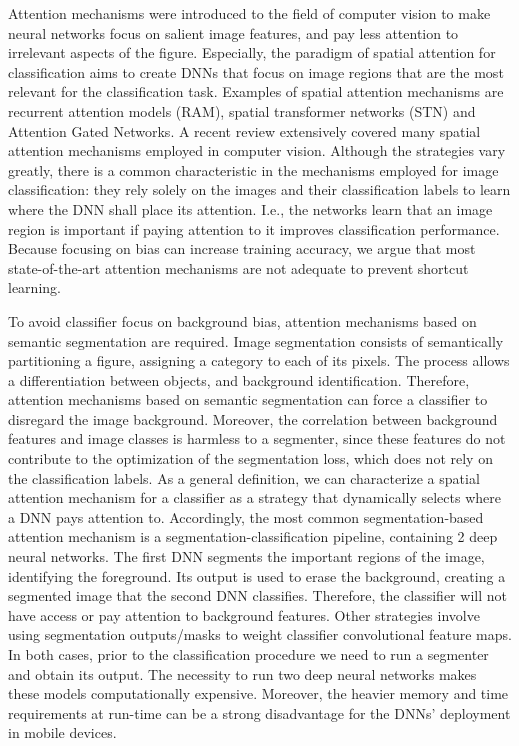 \documentclass[fleqn,10pt]{wlscirep}
\begin{document}
Attention mechanisms were introduced to the field of computer vision to make neural networks focus on salient image features, and pay less attention to irrelevant aspects of the figure. Especially, the paradigm of spatial attention for classification aims to create DNNs that focus on image regions that are the most relevant for the classification task\cite{attentionSurvey}. Examples of spatial attention mechanisms are recurrent attention models (RAM)\cite{RAM}, spatial transformer networks (STN)\cite{STN} and Attention Gated Networks\cite{AGNet}. A recent review\cite{attentionSurvey} extensively covered many spatial attention mechanisms employed in computer vision. Although the strategies vary greatly, there is a common characteristic in the mechanisms employed for image classification: they rely solely on the images and their classification labels to learn where the DNN shall place its attention. I.e., the networks learn that an image region is important if paying attention to it improves classification performance. Because focusing on bias can increase training accuracy, we argue that most state-of-the-art attention mechanisms are not adequate to prevent shortcut learning.

To avoid classifier focus on background bias, attention mechanisms based on semantic segmentation are required. Image segmentation consists of semantically partitioning a figure, assigning a category to each of its pixels. The process allows a differentiation between objects, and background identification. Therefore, attention mechanisms based on semantic segmentation can force a classifier to disregard the image background. Moreover, the correlation between background features and image classes is harmless to a segmenter, since these features do not contribute to the optimization of the segmentation loss, which does not rely on the classification labels. As a general definition, we can characterize a spatial attention mechanism for a classifier as a strategy that dynamically selects where a DNN pays attention to. Accordingly, the most common segmentation-based attention mechanism is a segmentation-classification pipeline, containing 2 deep neural networks. The first DNN segments the important regions of the image, identifying the foreground. Its output is used to erase the background, creating a segmented image that the second DNN classifies. Therefore, the classifier will not have access or pay attention to background features. Other strategies involve using segmentation outputs/masks to weight classifier convolutional feature maps\cite{SSG}. In both cases, prior to the classification procedure we need to run a segmenter and obtain its output. The necessity to run two deep neural networks makes these models computationally expensive. Moreover, the heavier memory and time requirements at run-time can be a strong disadvantage for the DNNs' deployment in mobile devices.
\end{document}
